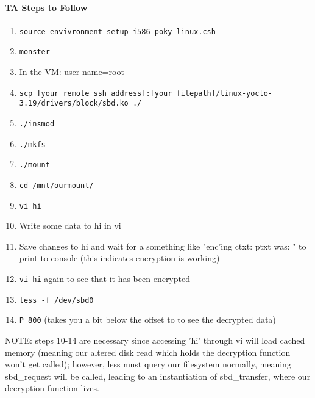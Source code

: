 \documentclass[titlepage,draftclsnofoot,onecolumn]{article}
\begin{document}
\paragraph{TA Steps to Follow}


\begin{enumerate}
	\item \texttt{source envivronment-setup-i586-poky-linux.csh}
	\item \texttt{monster}
	\item In the VM: user name=root
	\item \texttt{scp [your remote ssh address]:[your filepath]/linux-yocto-3.19/drivers/block/sbd.ko ./}
	\item \texttt{./insmod}
	\item \texttt{./mkfs}
	\item \texttt{./mount}
	\item \texttt{cd /mnt/ourmount/}
	\item \texttt{vi hi}
	\item Write some data to hi in vi
	\item Save changes to hi and wait for a something like "enc'ing ctxt: ptxt was: " to print to console (this indicates encryption is working)
	\item \texttt{vi hi} again to see that it has been encrypted
	\item \texttt{less -f /dev/sbd0}
	\item \texttt{P 800} (takes you a bit below the offset to to see the decrypted data)
  \end{enumerate}
  
  NOTE: steps 10-14 are necessary since accessing 'hi' through vi will load cached memory (meaning our altered disk read which holds the decryption function won't get called); however, less must query our filesystem normally, meaning sbd\_request will be called, leading to an instantiation of sbd\_transfer, where our decryption function lives.
\end{document}
